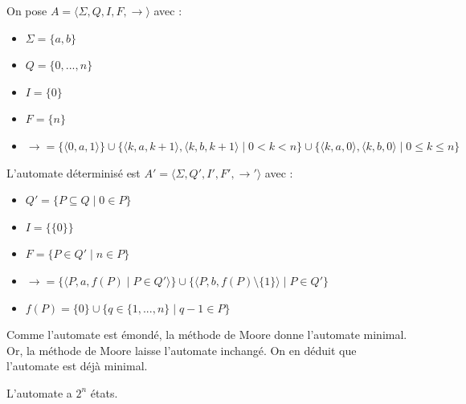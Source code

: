 \begin{corrections}

  \begin{questions}

  \item On pose $A = \langle \Sigma, Q, I, F, \rightarrow \rangle$ avec :
    \begin{itemize}
    \item $\Sigma = \{a, b\}$
    \item $Q = \{0, ..., n\}$
    \item $I = \{0\}$
    \item $F = \{n\}$
    \item $\rightarrow = \{\langle 0, a, 1\rangle\} \cup \{\langle k, a, k+1\rangle, \langle k, b, k+1\rangle \mid 0 < k < n \}  \cup \{\langle k, a, 0\rangle, \langle k, b, 0\rangle \mid 0 \le k \le n \}$ 
    \end{itemize}

  \item L'automate déterminisé est $A' = \langle \Sigma, Q', I', F', \rightarrow' \rangle$ avec :
    \begin{itemize}
    \item $Q' = \{ P \subseteq Q \mid 0\in P\}$
    \item $I = \{\{0\}\}$
    \item $F = \{P \in Q' \mid n \in P\}$
    \item $\rightarrow = \{\langle P, a, f(P) \mid P \in Q' \rangle\} \cup \{\langle P, b, f(P) \setminus \{1\}\rangle \mid P \in Q' \}$
    \item $f(P) = \{0\} \cup \{q \in \{1, ..., n\} \mid q-1 \in P\}$
    \end{itemize}

  \item Comme l'automate est émondé, la méthode de Moore donne l'automate minimal. Or, la méthode de Moore laisse l'automate inchangé.
    On en déduit que l'automate est déjà minimal.

  \item L'automate a $2^n$ états. 

  \end{questions}

\end{corrections}

\endgroup
\endinput
